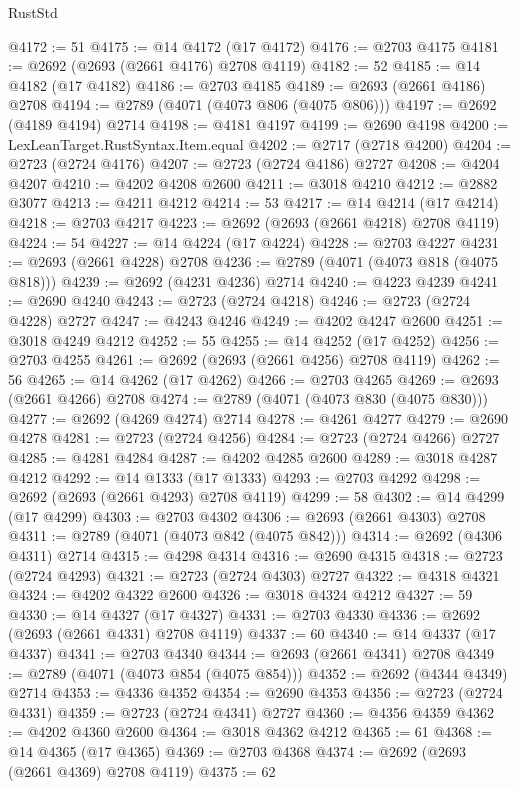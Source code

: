 \begin{lexlean}{RustStd}
\begin{coremodule}
{\begin{coremodule}
{{{{{{{{{{{{{{{{{{{{{{{{{{{{{{{{{{{{{{{@4172 := 51
@4175 := @14 @4172 (@17 @4172)
@4176 := @2703 @4175
@4181 := @2692 (@2693 (@2661 @4176) @2708 @4119)
@4182 := 52
@4185 := @14 @4182 (@17 @4182)
@4186 := @2703 @4185
@4189 := @2693 (@2661 @4186) @2708
@4194 := @2789 (@4071 (@4073 @806 (@4075 @806)))
@4197 := @2692 (@4189 @4194) @2714
@4198 := @4181 @4197
@4199 := @2690 @4198
@4200 := LexLeanTarget.RustSyntax.Item.equal
@4202 := @2717 (@2718 @4200)
@4204 := @2723 (@2724 @4176)
@4207 := @2723 (@2724 @4186) @2727
@4208 := @4204 @4207
@4210 := @4202 @4208 @2600
@4211 := @3018 @4210
@4212 := @2882 @3077
@4213 := @4211 @4212
@4214 := 53
@4217 := @14 @4214 (@17 @4214)
@4218 := @2703 @4217
@4223 := @2692 (@2693 (@2661 @4218) @2708 @4119)
@4224 := 54
@4227 := @14 @4224 (@17 @4224)
@4228 := @2703 @4227
@4231 := @2693 (@2661 @4228) @2708
@4236 := @2789 (@4071 (@4073 @818 (@4075 @818)))
@4239 := @2692 (@4231 @4236) @2714
@4240 := @4223 @4239
@4241 := @2690 @4240
@4243 := @2723 (@2724 @4218)
@4246 := @2723 (@2724 @4228) @2727
@4247 := @4243 @4246
@4249 := @4202 @4247 @2600
@4251 := @3018 @4249 @4212
@4252 := 55
@4255 := @14 @4252 (@17 @4252)
@4256 := @2703 @4255
@4261 := @2692 (@2693 (@2661 @4256) @2708 @4119)
@4262 := 56
@4265 := @14 @4262 (@17 @4262)
@4266 := @2703 @4265
@4269 := @2693 (@2661 @4266) @2708
@4274 := @2789 (@4071 (@4073 @830 (@4075 @830)))
@4277 := @2692 (@4269 @4274) @2714
@4278 := @4261 @4277
@4279 := @2690 @4278
@4281 := @2723 (@2724 @4256)
@4284 := @2723 (@2724 @4266) @2727
@4285 := @4281 @4284
@4287 := @4202 @4285 @2600
@4289 := @3018 @4287 @4212
@4292 := @14 @1333 (@17 @1333)
@4293 := @2703 @4292
@4298 := @2692 (@2693 (@2661 @4293) @2708 @4119)
@4299 := 58
@4302 := @14 @4299 (@17 @4299)
@4303 := @2703 @4302
@4306 := @2693 (@2661 @4303) @2708
@4311 := @2789 (@4071 (@4073 @842 (@4075 @842)))
@4314 := @2692 (@4306 @4311) @2714
@4315 := @4298 @4314
@4316 := @2690 @4315
@4318 := @2723 (@2724 @4293)
@4321 := @2723 (@2724 @4303) @2727
@4322 := @4318 @4321
@4324 := @4202 @4322 @2600
@4326 := @3018 @4324 @4212
@4327 := 59
@4330 := @14 @4327 (@17 @4327)
@4331 := @2703 @4330
@4336 := @2692 (@2693 (@2661 @4331) @2708 @4119)
@4337 := 60
@4340 := @14 @4337 (@17 @4337)
@4341 := @2703 @4340
@4344 := @2693 (@2661 @4341) @2708
@4349 := @2789 (@4071 (@4073 @854 (@4075 @854)))
@4352 := @2692 (@4344 @4349) @2714
@4353 := @4336 @4352
@4354 := @2690 @4353
@4356 := @2723 (@2724 @4331)
@4359 := @2723 (@2724 @4341) @2727
@4360 := @4356 @4359
@4362 := @4202 @4360 @2600
@4364 := @3018 @4362 @4212
@4365 := 61
@4368 := @14 @4365 (@17 @4365)
@4369 := @2703 @4368
@4374 := @2692 (@2693 (@2661 @4369) @2708 @4119)
@4375 := 62
}}}}}}}}}}}}}}}}}}}}}}}}}}}}}}}}}}}}}}}
\end{coremodule}}
\end{coremodule}
\end{lexlean}
